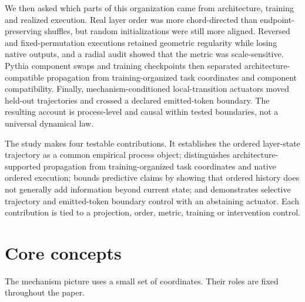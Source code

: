 \documentclass[11pt]{article}
\begin{document}
We then asked which parts of this organization came from architecture, training and realized execution. Real layer order was more chord-directed than endpoint-preserving shuffles, but random initializations were still more aligned. Reversed and fixed-permutation executions retained geometric regularity while losing native outputs, and a radial audit showed that the metric was scale-sensitive. Pythia component swaps and training checkpoints then separated architecture-compatible propagation from training-organized task coordinates and component compatibility. Finally, mechanism-conditioned local-transition actuators moved held-out trajectories and crossed a declared emitted-token boundary. The resulting account is process-level and causal within tested boundaries, not a universal dynamical law.

The study makes four testable contributions. It establishes the ordered layer-state trajectory as a common empirical process object; distinguishes architecture-supported propagation from training-organized task coordinates and native ordered execution; bounds predictive claims by showing that ordered history does not generally add information beyond current state; and demonstrates selective trajectory and emitted-token boundary control with an abstaining actuator. Each contribution is tied to a projection, order, metric, training or intervention control.

\section*{Core concepts}
The mechanism picture uses a small set of coordinates. Their roles are fixed throughout the paper.
\end{document}
